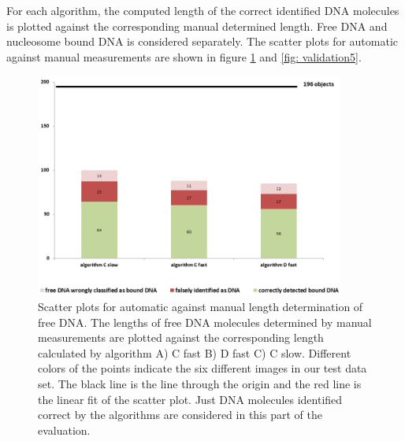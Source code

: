 \documentclass{article}
\begin{document}
For each algorithm, the computed length of the correct identified DNA molecules is plotted against the corresponding manual determined length. Free DNA and nucleosome bound DNA is considered separately. The scatter plots for automatic against manual measurements are shown in figure \ref{fig: validation4} and \ref{fig: validation5}.
%
\begin{figure}[!htb]
	\begin{center}
		\includegraphics[width = 0.9\textwidth]{validation4}
	\end{center}
	\caption{Scatter plots for automatic against manual length determination of free DNA. The lengths of free DNA molecules determined by manual measurements are plotted against the corresponding length calculated by algorithm A) C fast B) D fast C) C slow. Different colors of the points indicate the six different images in our test data set. The black line is the line through the origin and the red line is the linear fit of the scatter plot. Just DNA molecules identified correct by the algorithms are considered in this part of the evaluation.}
	\label{fig: validation4} %
\end{figure}
%
\end{document}
